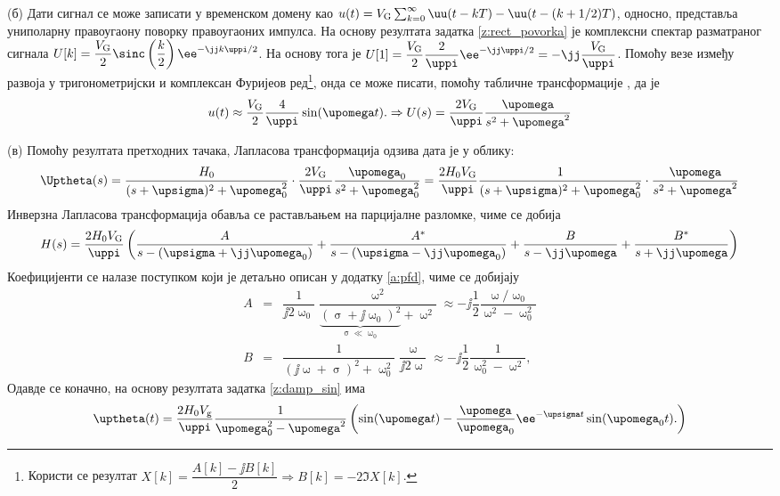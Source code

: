 (б) Дати сигнал се може записати у временском домену као 
$u(t) = V_{\rm G} \sum_{k = 0}^{\infty} \uu(t - kT) - \uu(t - (k+1/2)T)$, односно, представља униполарну правоугаону поворку 
правоугаоних импулса. 
На основу резултата задатка \ref{z:rect_povorka} је комплексни спектар разматраног сигнала
$U[k] = \dfrac{V_{\rm G}}{2} \sinc\left(\dfrac{k}{2}\right) \ee^{-\jj k \uppi / 2 } $.
На основу тога је
$U[1] = \dfrac{V_{\rm G}}{2} \dfrac{2}{\uppi} \ee^{-\jj\uppi/2} = - \jj \dfrac{V_{\rm G}}{\uppi}$.
Помоћу везе између развоја у тригонометријски и комплексан Фуријеов ред\footnote{Користи се 
резултат $X[k] = \dfrac{A[k] - \jj B[k]}{2} \Rightarrow B[k] = -2 \Im{X[k]}$.
}, онда се може писати, помоћу табличне трансформације , да је 
\begin{equation}
    u(t) \approx \dfrac{V_{\rm G}}{2}  
    \dfrac{4}{\uppi} \sin(\upomega t) .
    \Rightarrow
    U(s) = 
    \dfrac{2 V_{\rm G}}{\uppi}
    \dfrac{\upomega }{s^2 + \upomega^2}
\end{equation}

(в) Помоћу резултата претходних тачака, Лапласова трансформација одзива дата је у облику: 
\begin{equation}
    \Uptheta(s) =
    \dfrac{H_0}{(s + \upsigma)^2 + \upomega_0^2}
    \cdot
    \dfrac{2 V_{\rm G}}{\uppi}
    \dfrac{\upomega_0 }{s^2 + \upomega_0^2}
    = 
    \dfrac{2 H_0 V_{\rm G}}{\uppi}
    \dfrac{1}{(s + \upsigma)^2 + \upomega_0^2}
    \cdot
    \dfrac{\upomega }{s^2 + \upomega^2}
\end{equation}
Инверзна Лапласова трансформација обавља се растављањем на парцијалне разломке, чиме се добија 
\begin{equation}
    H(s) = 
    \dfrac{2 H_0 V_{\rm G}}{\uppi} \left(
    \dfrac{A}{ s - (\upsigma + \jj\upomega_0 ) } + \dfrac{A^\ast}{ s - (\upsigma - \jj\upomega_0 ) } 
    + \dfrac{B}{s - \jj\upomega} + \dfrac{B^*}{s + \jj\upomega}  
    \right)
\end{equation}
Коефицијенти се налазе поступком који је детаљно описан у додатку \ref{a:pfd}, чиме се добијају
\begin{eqnarray}
    A &=& \dfrac{1}{\jj2\upomega_0} \dfrac{\upomega^2}{ \underbrace{( \upsigma + \jj\upomega_0)^2}_{\upsigma \ll \upomega_0} + \upomega^2 }
   \approx 
   - \jj
   \dfrac{1}{2} \dfrac{\upomega/\upomega_0} { \upomega^2 - \upomega_0^2 } \\
   B &=& \dfrac{1}{ (\jj\upomega + \upsigma)^2 + \upomega_0^2 } \dfrac{\upomega}{\jj2\upomega}
   \approx
   - \jj 
   \dfrac{1}{2} 
   \dfrac{1}{\upomega_0^2 - \upomega^2},
\end{eqnarray}
Одавде се коначно, на основу резултата задатка \ref{z:damp_sin} има 
\begin{equation}
    \uptheta(t) = \dfrac{2 H_0 V_{\rm g}}{\uppi}
    \dfrac{1}{\upomega_0^2 - \upomega^2}
    \left(
        \sin(\upomega t )
        -
        \dfrac{\upomega}{\upomega_0} \ee^{-\upsigma t} \sin(\upomega_0 t ). \label{\ID.odziv}
    \right)
\end{equation}

